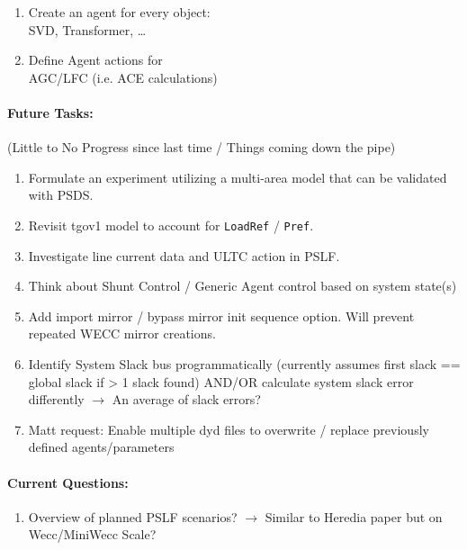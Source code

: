 \documentclass[12pt]{article}
\begin{document}
\begin{multicols}{2}
\begin{enumerate}
		\item Create an agent for every object: \\ SVD, Transformer, \ldots

		\item Define Agent actions for \\ AGC/LFC (i.e. ACE calculations)
		

	\end{enumerate}
\vfill\null
\columnbreak

\paragraph{Future Tasks:}(Little to No Progress since last time / Things coming down the pipe)
	\begin{enumerate}

		\item Formulate an experiment utilizing a multi-area model that can be validated with PSDS.
		\item Revisit tgov1 model to account for \verb|LoadRef| / \verb|Pref|.
		\item Investigate line current data and ULTC action in PSLF.
		\item Think about Shunt Control / Generic Agent control based on system state(s)

		\item Add import mirror / bypass mirror init sequence option. Will prevent repeated WECC mirror creations.

		\item Identify System Slack bus programmatically (currently assumes first slack == global slack if > 1 slack found)
		\subitem AND/OR calculate system slack error differently $\rightarrow$ An average of slack errors?

		\item Matt request: Enable multiple dyd files to overwrite / replace previously defined agents/parameters
		
		
	\end{enumerate}
	\paragraph{Current Questions:}
	\begin{enumerate}
		\item Overview of planned PSLF scenarios? $\rightarrow$ Similar to Heredia paper but on Wecc/MiniWecc Scale? 
		

\end{enumerate}
\end{multicols}
\end{document}
